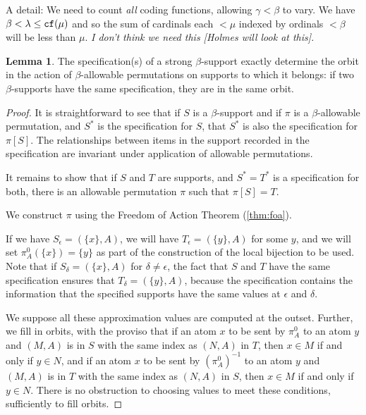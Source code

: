 \documentclass[112pt]{article}
\theoremstyle{definition}
\newtheorem{lemma}[theorem]{Lemma}
\theoremstyle{remark}
\newcommand{\rk}[1]{{\color{blue}\sl #1}}
\begin{document}
A detail:  We need to count {\em all\/} coding functions, allowing $\gamma<\beta$ to vary.   We have $\beta < \lambda \leq {\tt cf}(\mu)$ and so the sum of cardinals each $<\mu$ indexed by ordinals $<\beta$ will be less than $\mu$. \rk{I don't think we need this [Holmes will look at this].}

\begin{lemma}\label{lem:specification_determines_orbit}
The specification(s) of a strong $\beta$-support exactly determine the orbit in the action of $\beta$-allowable permutations on supports to which it belongs:  if two $\beta$-supports have the same specification, they are in the same orbit.
\end{lemma}
\begin{proof}
It is straightforward to see that if $S$ is a $\beta$-support and if $\pi$ is a $\beta$-allowable permutation, and $S^*$ is the  specification for $S$, that $S^*$ is also the specification for $\pi[S]$.  The relationships between items in the support recorded in the specification are invariant under application of allowable permutations.

It remains to show that if $S$ and $T$ are supports, and $S^*=T^*$ is a specification for both, there is an allowable permutation $\pi$ such that $\pi[S]=T$.

We construct $\pi$ using the Freedom of Action Theorem {(\ref{thm:foa})}.

If we have $S_\epsilon = (\{x\},A)$, we will have $T_\epsilon = (\{y\},A)$ for some $y$, and we will set $\pi^0_A(\{x\}) = \{y\}$ as part of the construction of the local bijection to be used.     Note that if $S_\delta = (\{x\},A)$ for $\delta \neq \epsilon$, the fact that $S$ and
$T$ have the same specification ensures that $T_\delta = (\{y\},A)$, because the specification contains the information that the specified supports have the same values at $\epsilon$ and $\delta$.

We suppose all these approximation values are computed at the outset.  Further, we fill in orbits,
with the proviso that if an atom $x$  to be sent by $\pi^0_A$ to an atom $y$ and $(M,A)$ is in $S$ with the same index as $(N,A)$ in $T$, then $x \in M$ if and only if $y \in N$,   and if an atom $x$  to be sent by $(\pi^0_A)^{-1}$ to an atom $y$ and $(M,A)$ is in $T$ with the same index as $(N,A)$ in $S$, then $x \in M$ if and only if $y \in N$.  There is no obstruction to choosing values to meet these conditions, sufficiently to fill orbits.


\end{proof}
\end{document}
